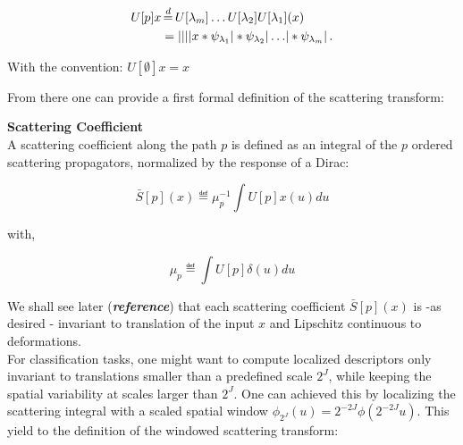 \documentclass[a4paper,11pt]{report}
\begin{document}
{\begin{defn}
				\begin{equation}
					\label{eq:path ordered SP}
					\begin{split}
						U[p]x &\eqdef U[\lambda_{m}]\dots U[\lambda_{2}]U[\lambda_{1}](x) \\
							&= \abs{\abs{\abs{\abs{x \ast \psi_{\lambda_{1}}} \ast \psi_{\lambda_{2}}} 
							\dots } \ast \psi_{\lambda_{m}}}.   
					\end{split}
				\end{equation}
				
				With the convention: $U[\emptyset]x = x$\\
				\label{def:path ordered SO}
      \end{defn} 
      
      From there one can provide a first formal definition of the scattering transform:
      
      \begin{defn} \textbf{Scattering Coefficient}\\
				A scattering coefficient along the path $p$ is defined as an integral of the $p$ ordered scattering propagators, normalized by the response of a Dirac:

				\begin{equation}
					\label{eq:ST1}
					\bar{S}[p](x) \eqdef \mu_{p}^{-1} \int U[p]x(u) du
				\end{equation}
				
				with,
				
				\begin{equation*}
					\label{eq:ST normalization}
					\mu_{p} \eqdef \int U[p]\delta(u)du      
				\end{equation*}
				\label{def:SC}
      \end{defn}
      
      We shall see later (\textbf{\textit{reference}}) that each scattering coefficient $\bar{S}[p](x)$ is -as desired - invariant to translation of the input $x$ and Lipschitz continuous to deformations.\\
      
      For classification tasks, one might want to compute localized descriptors only invariant to translations smaller than a predefined scale $2^{J}$, while keeping the spatial variability at 
      scales larger than $2^{J}$. One can achieved this by localizing the scattering integral with a scaled spatial window $\phi_{2^{J}}(u) = 2^{-2J} \phi(2^{-2J}u)$. This yield to the definition of the windowed scattering transform:
      
}
\end{document}
